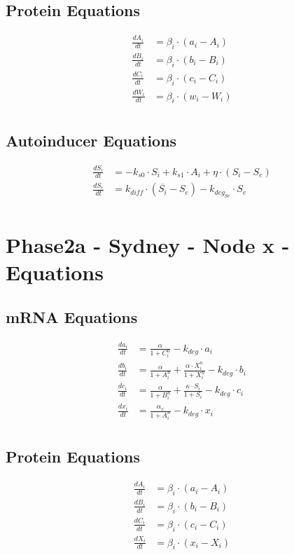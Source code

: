 \documentclass[fleqn]{article}
\begin{document}
\subsection*{Protein Equations}
\begin{align*}
\frac{dA_i}{dt} &= \beta_i \cdot (a_i - A_i) \\
\frac{dB_i}{dt} &= \beta_i \cdot (b_i - B_i) \\
\frac{dC_i}{dt} &= \beta_i \cdot (c_i - C_i) \\
\frac{dW_i}{dt} &= \beta_i \cdot (w_i - W_i) \\
\end{align*}

\subsection*{Autoinducer Equations}
\begin{align*}
\frac{dS_i}{dt} &= -k_{s0} \cdot S_i + k_{s1} \cdot A_i + \eta \cdot (S_i - S_e) \\
\frac{dS_e}{dt} &= k_{diff} \cdot (\overline{S_i} - S_e) - k_{deg_{Se}} \cdot S_e \\
\end{align*}

\pagebreak

\section*{Phase2a - Sydney - Node x - Equations}
\subsection*{mRNA Equations}
\begin{align*}
\frac{da_i}{dt} &= \frac{\alpha}{1 + C_i^n} - k_{deg} \cdot a_i \\
\frac{db_i}{dt} &= \frac{\alpha}{1 + A_i^n} + \frac{\alpha \cdot X_i^n}{1 + X_i^n} - k_{deg} \cdot b_i \\
\frac{dc_i}{dt} &= \frac{\alpha}{1 + B_i^n} + \frac{\kappa \cdot S_i}{1 + S_i} - k_{deg} \cdot c_i \\
\frac{dx_i}{dt} &= \frac{\alpha_x}{1 + A_i^n} - k_{deg} \cdot x_i \\
\end{align*}

\subsection*{Protein Equations}
\begin{align*}
\frac{dA_i}{dt} &= \beta_i \cdot (a_i - A_i) \\
\frac{dB_i}{dt} &= \beta_i \cdot (b_i - B_i) \\
\frac{dC_i}{dt} &= \beta_i \cdot (c_i - C_i) \\
\frac{dX_i}{dt} &= \beta_i \cdot (x_i - X_i) \\
\end{align*}
\end{document}

